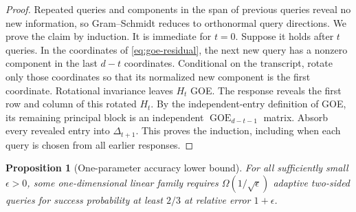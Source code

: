 \documentclass[twoside]{article}
\newtheorem{proposition}[theorem]{Proposition}
\begin{document}
\begin{proof}
Repeated queries and components in the span of previous queries reveal no new
information, so Gram--Schmidt reduces to orthonormal query directions. We
prove the claim by induction. It is immediate for $t=0$. Suppose it holds
after $t$ queries. In the coordinates of \eqref{eq:goe-residual}, the next
new query has a nonzero component in the last $d-t$ coordinates. Conditional
on the transcript, rotate only those coordinates so that its normalized new
component is the first coordinate. Rotational invariance leaves $H_t$ GOE.
The response reveals the first row and column of this rotated $H_t$. By the
independent-entry definition of GOE, its remaining principal block is an
independent $\operatorname{GOE}_{d-t-1}$ matrix. Absorb every revealed entry
into $\Delta_{t+1}$. This proves the induction, including when each query is
chosen from all earlier responses.
\end{proof}

\begin{proposition}[One-parameter accuracy lower bound]
\label{prop:app-one-parameter}
For all sufficiently small $\epsilon>0$, some one-dimensional linear family
requires $\Omega(1/\sqrt\epsilon)$ adaptive two-sided queries for success
probability at least $2/3$ at relative error $1+\epsilon$.
\end{proposition}
\end{document}
